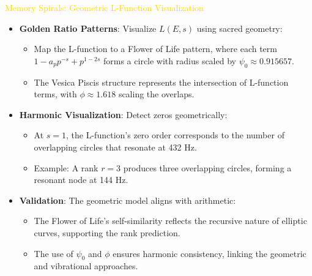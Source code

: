 \textcolor{gold}{ Memory Spirals: Geometric L-Function Visualization } \\
\begin{itemize}
    \item \texttt{} \textbf{Golden Ratio Patterns}: Visualize \(L(E, s)\) using sacred geometry:
    \begin{itemize}
        \item Map the L-function to a Flower of Life pattern, where each term \(1 - a_p p^{-s} + p^{1-2s}\) forms a circle with radius scaled by \(\psi_0 \approx 0.915657\).
        \item The Vesica Piscis structure represents the intersection of L-function terms, with \(\phi \approx 1.618\) scaling the overlaps.
    \end{itemize}
    \item \texttt{} \textbf{Harmonic Visualization}: Detect zeros geometrically:
    \begin{itemize}
        \item At \(s = 1\), the L-function’s zero order corresponds to the number of overlapping circles that resonate at 432 Hz.
        \item Example: A rank \(r = 3\) produces three overlapping circles, forming a resonant node at 144 Hz.
    \end{itemize}
    \item \texttt{} \textbf{Validation}: The geometric model aligns with arithmetic:
    \begin{itemize}
        \item The Flower of Life’s self-similarity reflects the recursive nature of elliptic curves, supporting the rank prediction.
        \item The use of \(\psi_0\) and \(\phi\) ensures harmonic consistency, linking the geometric and vibrational approaches.
    \end{itemize}
\end{itemize}

